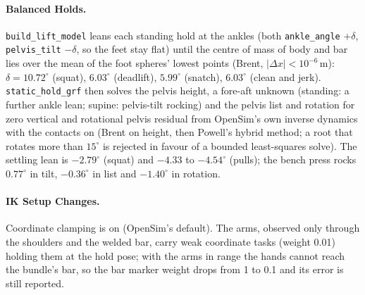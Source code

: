 \documentclass[11pt,a4paper]{article}
\begin{document}
\paragraph{Balanced Holds.} \texttt{build\_lift\_model} leans each standing
hold at the ankles (both \texttt{ankle\_angle} $+\delta$, \texttt{pelvis\_tilt}
$-\delta$, so the feet stay flat) until the centre of mass of body and bar lies
over the mean of the foot spheres' lowest points (Brent, $|\Delta x| <
10^{-6}$\,m): $\delta = 10.72^\circ$ (squat), $6.03^\circ$ (deadlift),
$5.99^\circ$ (snatch), $6.03^\circ$ (clean and jerk). \texttt{static\_hold\_grf}
then solves the pelvis height, a fore-aft unknown (standing: a further ankle
lean; supine: pelvis-tilt rocking) and the pelvis list and rotation for zero
vertical and rotational pelvis residual from OpenSim's own inverse dynamics with
the contacts on (Brent on height, then Powell's hybrid method; a root that
rotates more than $15^\circ$ is rejected in favour of a bounded least-squares
solve). The settling lean is $-2.79^\circ$ (squat) and $-4.33$ to $-4.54^\circ$
(pulls); the bench press rocks $0.77^\circ$ in tilt, $-0.36^\circ$ in list and
$-1.40^\circ$ in rotation.

\paragraph{IK Setup Changes.} Coordinate clamping is on (OpenSim's default).
The arms, observed only through the shoulders and the welded bar, carry weak
coordinate tasks (weight 0.01) holding them at the hold pose; with the arms in
range the hands cannot reach the bundle's bar, so the bar marker weight drops
from 1 to 0.1 and its error is still reported.
\end{document}
